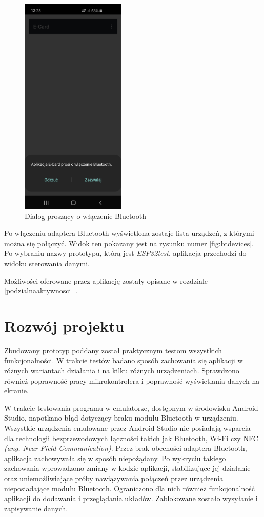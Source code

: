 \documentclass[a4paper,12pt, twoside]{article}
\begin{document}
    	\begin{figure}[H]
    	        \centering
    			\includegraphics[width=5cm]{images/rys_13bluetoothdialog.jpg}
    			\caption{Dialog proszący o włączenie Bluetooth}
                \label{fig:bton}
    	\end{figure}
    	
    	Po włączeniu adaptera Bluetooth wyświetlona zostaje lista urządzeń, z którymi można się połączyć. Widok ten pokazany jest na rysunku numer \ref{fig:btdevices}. Po wybraniu nazwy prototypu, którą jest \textit{ESP32test}, aplikacja przechodzi do widoku sterowania danymi.
    	
    	Możliwości oferowane przez aplikację zostały opisane w rozdziale \ref{podzialnaaktywnosci} .
    	\section{Rozwój projektu}
    	Zbudowany prototyp poddany został praktycznym testom wszystkich funkcjonalności. W trakcie testów badano sposób zachowania się aplikacji w różnych wariantach działania i na kilku różnych urządzeniach. Sprawdzono również poprawność pracy mikrokontrolera i poprawność wyświetlania danych na ekranie.
    	
    	W trakcie testowania programu w emulatorze, dostępnym w środowisku Android Studio, napotkano błąd dotyczący braku modułu Bluetooth w urządzeniu. Wszystkie urządzenia emulowane przez Android Studio nie posiadają wsparcia dla technologii bezprzewodowych łączności takich jak Bluetooth, Wi-Fi czy NFC \textit{(ang. Near Field Communication)}. Przez brak obecności adaptera Bluetooth, aplikacja zachowywała się w sposób niepożądany. Po wykryciu takiego zachowania wprowadzono zmiany w kodzie aplikacji, stabilizujące jej działanie oraz uniemożliwiające próby nawiązywania połączeń przez urządzenia nieposiadające modułu Bluetooth. Ograniczono dla nich również funkcjonalność aplikacji do dodawania i przeglądania układów. Zablokowane zostało wysyłanie i zapisywanie danych.
    	
\end{document}
